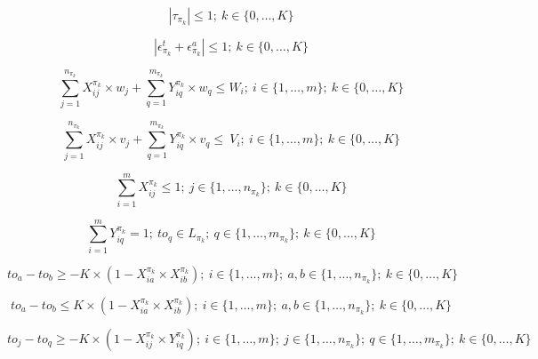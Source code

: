 \documentclass[preprint]{elsarticle}
\begin{document}
\begin{equation} \label{eq:torqlong}
	| \tau_{\pi_k} | \leq 1;\ k \in \{0, \ldots, K\}
\end{equation}

\begin{equation} \label{eq:torqlat}
	| \epsilon_{\pi_k}^t + \epsilon_{\pi_k}^a| \leq  1; \ k \in \{0, \ldots, K\}
\end{equation}

\begin{equation} \label{eq:app2}
	\sum_{j=1}^{n_{\pi_k}} X_{ij}^{\pi_k} \times w_j + \sum_{q=1}^{m_{\pi_k}} Y_{iq}^{\pi_k} \times w_q  \leq W_i; \ i \in \{1, \ldots, m\}; \ k \in \{0, \ldots, K\}
\end{equation}

\begin{equation} \label{eq:app3}
	\sum_{j=1}^{n_{\pi_k}} X_{ij}^{\pi_k} \times v_j + \sum_{q=1}^{m_{\pi_k}} Y_{iq}^{\pi_k} \times v_q  \leq\ V_i; \ i \in \{1, \ldots, m\}; \ k \in \{0, \ldots, K\}
\end{equation}

\begin{equation} \label{eq:app4}
	\sum_{i=1}^{m} X_{ij}^{\pi_k} \leq 1; \ j \in \{1, \ldots, n_{\pi_k}\}; \ k \in \{0, \ldots, K\}
\end{equation}

\begin{equation} \label{eq:app5}
	\sum_{i=1}^{m} Y_{iq}^{\pi_k} = 1;\ to_q \in L_{\pi_k}; \ q \in \{1, \ldots, m_{\pi_k}\}; \ k \in \{0, \ldots, K\}
\end{equation}

\begin{equation} \label{eq18}
	to_a - to_b \geq -K \times (1-X_{ia}^{\pi_k} \times X_{ib}^{\pi_k}); \ i \in \{1, \ldots, m\}; \ a,b \in \{1, \ldots, n_{\pi_k}\}; \ k \in \{0, \ldots, K\}
\end{equation}

\begin{equation} \label{eq19}
	to_a - to_b \leq K \times (1-X_{ia}^{\pi_k} \times X_{ib}^{\pi_k}); \ i \in \{1, \ldots, m\}; \ a,b \in \{1, \ldots, n_{\pi_k}\}; \ k \in \{0, \ldots, K\}
\end{equation}

\begin{equation} \label{eq20}
	to_j - to_q \geq -K \times (1-X_{ij}^{\pi_k} \times Y_{iq}^{\pi_k}); \ i \in \{1, \ldots, m\}; \ j \in \{1, \ldots, n_{\pi_k}\}; \ q \in \{1, \ldots, m_{\pi_k}\}; \ k \in \{0, \ldots, K\}
\end{equation}
\end{document}
